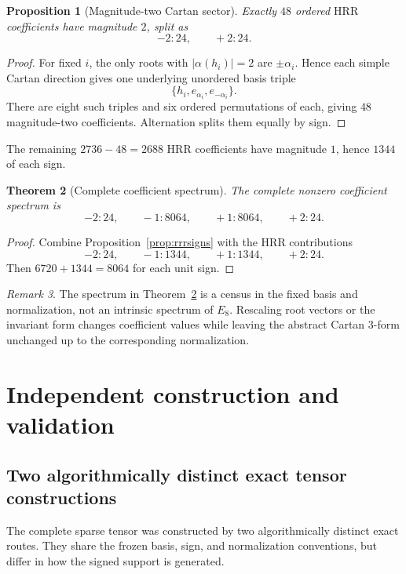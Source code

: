 \documentclass[11pt]{article}
\newtheorem{theorem}{Theorem}[section]
\newtheorem{proposition}[theorem]{Proposition}
\theoremstyle{definition}
\theoremstyle{remark}
\newtheorem{remark}[theorem]{Remark}
\newcommand{\HRR}{\mathrm{HRR}}
\begin{document}
\begin{proposition}[Magnitude-two Cartan sector]\label{prop:mag2}
Exactly $48$ ordered $\HRR$ coefficients have magnitude $2$, split as
\[
-2:24,
\qquad
+2:24.
\]
\end{proposition}

\begin{proof}
For fixed $i$, the only roots with $|\alpha(h_i)|=2$ are $\pm\alpha_i$.  Hence each simple Cartan direction gives one underlying unordered basis triple
\[
\{h_i,e_{\alpha_i},e_{-\alpha_i}\}.
\]
There are eight such triples and six ordered permutations of each, giving $48$ magnitude-two coefficients.  Alternation splits them equally by sign.
\end{proof}

The remaining $2736-48=2688$ $\HRR$ coefficients have magnitude $1$, hence $1344$ of each sign.

\begin{theorem}[Complete coefficient spectrum]\label{thm:spectrum}
The complete nonzero coefficient spectrum is
\[
\boxed{
-2:24,\qquad
-1:8064,\qquad
+1:8064,\qquad
+2:24.}
\]
\end{theorem}

\begin{proof}
Combine Proposition~\ref{prop:rrrsigns} with the $\HRR$ contributions
\[
-2:24,\qquad -1:1344,\qquad +1:1344,\qquad +2:24.
\]
Then $6720+1344=8064$ for each unit sign.
\end{proof}

\begin{remark}
The spectrum in Theorem~\ref{thm:spectrum} is a census in the fixed basis and normalization, not an intrinsic spectrum of $E_8$.  Rescaling root vectors or the invariant form changes coefficient values while leaving the abstract Cartan 3-form unchanged up to the corresponding normalization.
\end{remark}

\section{Independent construction and validation}\label{sec:validation}

\subsection{Two algorithmically distinct exact tensor constructions}

The complete sparse tensor was constructed by two algorithmically distinct exact routes.  They share the frozen basis, sign, and normalization conventions, but differ in how the signed support is generated.
\end{document}
